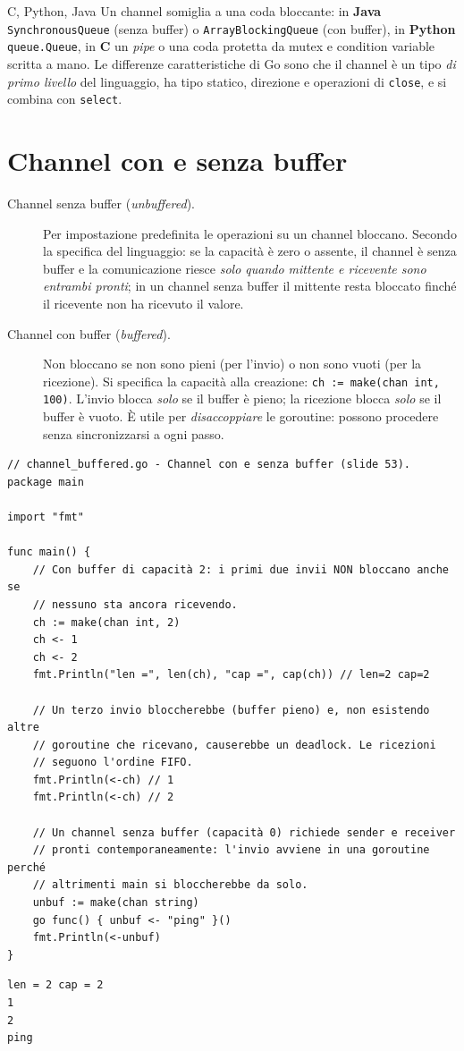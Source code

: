 \documentclass[11pt,a4paper]{report}
\newcommand{\cod}[1]{\texttt{#1}}
\begin{document}
\begin{confronto}{C, Python, Java}
Un channel somiglia a una coda bloccante: in \textbf{Java}
\cod{SynchronousQueue} (senza buffer) o \cod{ArrayBlockingQueue} (con buffer), in
\textbf{Python} \cod{queue.Queue}, in \textbf{C} un \emph{pipe} o una coda
protetta da mutex e condition variable scritta a mano. Le differenze
caratteristiche di Go sono che il channel è un tipo \emph{di primo livello} del
linguaggio, ha tipo statico, direzione e operazioni di \cod{close}, e si
combina con \cod{select}.
\end{confronto}

\section{Channel con e senza buffer}\label{sec:buffered}

\begin{description}
  \item[Channel senza buffer (\emph{unbuffered}).] Per impostazione
        predefinita le operazioni su un channel bloccano. Secondo la specifica del
        linguaggio: se la capacità è zero o assente, il channel è
        senza buffer e la comunicazione riesce \emph{solo quando mittente e
        ricevente sono entrambi pronti}; in un channel senza buffer il mittente
        resta bloccato finché il ricevente non ha ricevuto il valore.
  \item[Channel con buffer (\emph{buffered}).] Non bloccano se non sono
        pieni (per l'invio) o non sono vuoti (per la ricezione). Si specifica la
        capacità alla creazione: \cod{ch := make(chan int, 100)}. L'invio
        blocca \emph{solo} se il buffer è pieno; la ricezione blocca \emph{solo}
        se il buffer è vuoto. È utile per \emph{disaccoppiare} le goroutine:
        possono procedere senza sincronizzarsi a ogni passo.
\end{description}

\begin{lstlisting}[style=gocode,caption={\texttt{06\_concurrency/channel\_buffered.go}}]
// channel_buffered.go - Channel con e senza buffer (slide 53).
package main

import "fmt"

func main() {
	// Con buffer di capacità 2: i primi due invii NON bloccano anche se
	// nessuno sta ancora ricevendo.
	ch := make(chan int, 2)
	ch <- 1
	ch <- 2
	fmt.Println("len =", len(ch), "cap =", cap(ch)) // len=2 cap=2

	// Un terzo invio bloccherebbe (buffer pieno) e, non esistendo altre
	// goroutine che ricevano, causerebbe un deadlock. Le ricezioni
	// seguono l'ordine FIFO.
	fmt.Println(<-ch) // 1
	fmt.Println(<-ch) // 2

	// Un channel senza buffer (capacità 0) richiede sender e receiver
	// pronti contemporaneamente: l'invio avviene in una goroutine perché
	// altrimenti main si bloccherebbe da solo.
	unbuf := make(chan string)
	go func() { unbuf <- "ping" }()
	fmt.Println(<-unbuf)
}
\end{lstlisting}
\begin{lstlisting}[style=output]
len = 2 cap = 2
1
2
ping
\end{lstlisting}
\end{document}

